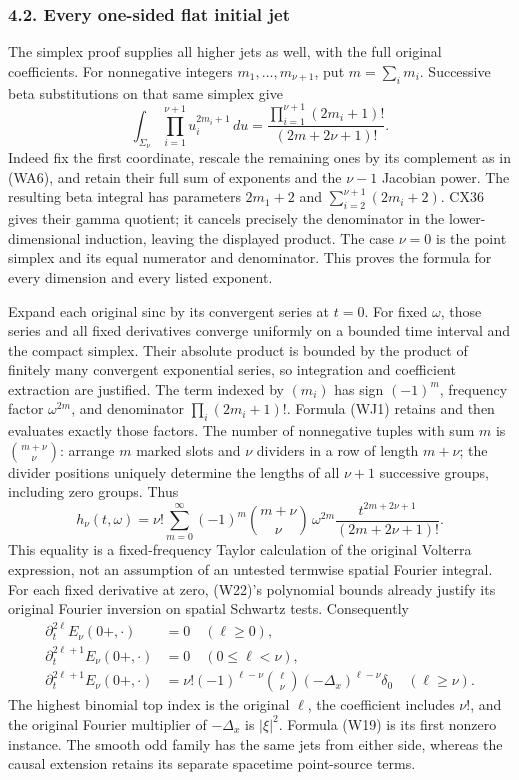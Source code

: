 \documentclass[
  11pt,
]{article}
\begin{document}
\subsubsection{4.2. Every one-sided flat initial
jet}\label{every-one-sided-flat-initial-jet}

The simplex proof supplies all higher jets as well, with the full
original coefficients. For nonnegative integers
\(m_1,\ldots,m_{\nu+1}\), put \(m=\sum_i m_i\). Successive beta
substitutions on that same simplex give \[
 \int_{\Sigma_\nu}\prod_{i=1}^{\nu+1}u_i^{2m_i+1}\,du
   =\frac{\prod_{i=1}^{\nu+1}(2m_i+1)!}
           {(2m+2\nu+1)!}.
 \tag{WJ1}
\] Indeed fix the first coordinate, rescale the remaining ones by its
complement as in (WA6), and retain their full sum of exponents and the
\(\nu-1\) Jacobian power. The resulting beta integral has parameters
\(2m_1+2\) and \(\sum_{i=2}^{\nu+1}(2m_i+2)\). CX36 gives their gamma
quotient; it cancels precisely the denominator in the lower-dimensional
induction, leaving the displayed product. The case \(\nu=0\) is the
point simplex and its equal numerator and denominator. This proves the
formula for every dimension and every listed exponent.

Expand each original sinc by its convergent series at \(t=0\). For fixed
\(\omega\), those series and all fixed derivatives converge uniformly on
a bounded time interval and the compact simplex. Their absolute product
is bounded by the product of finitely many convergent exponential
series, so integration and coefficient extraction are justified. The
term indexed by \((m_i)\) has sign \((-1)^m\), frequency factor
\(\omega^{2m}\), and denominator \(\prod_i(2m_i+1)!\). Formula (WJ1)
retains and then evaluates exactly those factors. The number of
nonnegative tuples with sum \(m\) is \(\binom{m+\nu}{\nu}\): arrange
\(m\) marked slots and \(\nu\) dividers in a row of length \(m+\nu\);
the divider positions uniquely determine the lengths of all \(\nu+1\)
successive groups, including zero groups. Thus \[
 h_\nu(t,\omega)=\nu!\sum_{m=0}^\infty
   (-1)^m\binom{m+\nu}{\nu}\,
       \omega^{2m}\frac{t^{2m+2\nu+1}}{(2m+2\nu+1)!}.
 \tag{WJ2}
\] This equality is a fixed-frequency Taylor calculation of the original
Volterra expression, not an assumption of an untested termwise spatial
Fourier integral. For each fixed derivative at zero, (W22)'s polynomial
bounds already justify its original Fourier inversion on spatial
Schwartz tests. Consequently \[
\begin{split}
 \partial_t^{2\ell}E_\nu(0+,\cdot)&=0\quad(\ell\geq0),\\
 \partial_t^{2\ell+1}E_\nu(0+,\cdot)&=0\quad(0\leq\ell<\nu),\\
 \partial_t^{2\ell+1}E_\nu(0+,\cdot)
  &=\nu!(-1)^{\ell-\nu}\binom{\ell}{\nu}
                  (-\Delta_x)^{\ell-\nu}\delta_0
                       \quad(\ell\geq\nu).
\end{split}
 \tag{WJ3}
\] The highest binomial top index is the original \(\ell\), the
coefficient includes \(\nu!\), and the original Fourier multiplier of
\(-\Delta_x\) is \(|\xi|^2\). Formula (W19) is its first nonzero
instance. The smooth odd family has the same jets from either side,
whereas the causal extension retains its separate spacetime point-source
terms.
\end{document}
